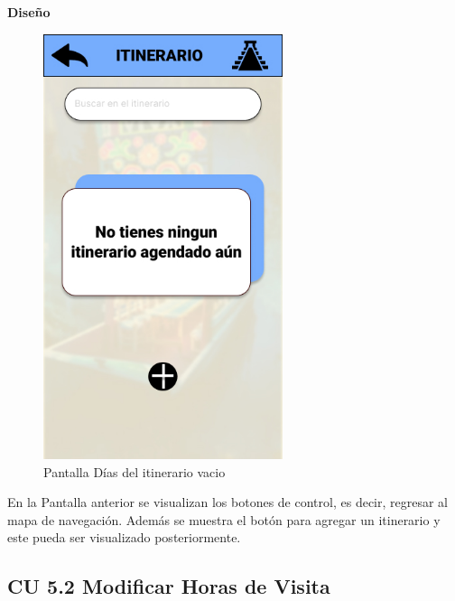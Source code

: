 \textbf{Diseño}
\begin{figure}[h]
        \centering
        \includegraphics[width= 7cm]{Pantallas Prototipo3/IU36-dias del itineraio vacio.jpg}
        \caption{Pantalla Días del itinerario vacio}
        \label{fig:enter-label}
    \end{figure}
 

En la Pantalla anterior se visualizan los botones de control, es decir, regresar al mapa de navegación. Además se muestra el botón para agregar un itinerario y este pueda ser visualizado posteriormente.

\newpage




\pagebreak
\subsection{CU 5.2 Modificar Horas de Visita}

